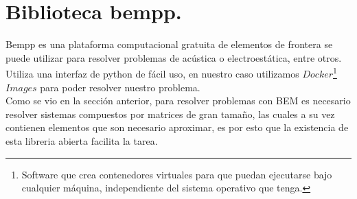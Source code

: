 \documentclass[11pt]{article}
\begin{document}
\section{Biblioteca bempp.}\label{sec:Biblioteca bempp.}
\setcounter{figure}{0}
\setcounter{equation}{0}
Bempp es una plataforma computacional gratuita de elementos de frontera se puede utilizar para resolver problemas de acústica o electroestática, entre otros. Utiliza una interfaz de python de fácil uso, en nuestro caso utilizamos $Docker$\footnote{Software que crea contenedores virtuales para que puedan ejecutarse bajo cualquier máquina, independiente del sistema operativo que tenga.} $Images$ para poder resolver nuestro problema.\\ 
Como se vio en la sección anterior, para resolver problemas con BEM es necesario resolver sistemas compuestos por matrices de gran tamaño, las cuales a su vez contienen elementos que son necesario aproximar, es por esto que la existencia de esta libreria abierta facilita la tarea.
\end{document}
